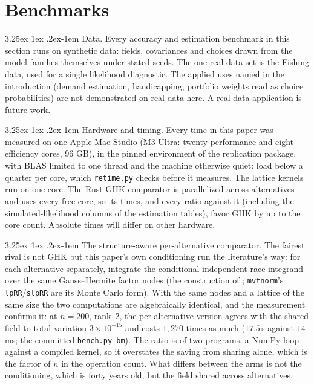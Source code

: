 \documentclass[11pt]{article}
\makeatletter
\renewcommand\paragraph{\@startsection{paragraph}{4}{\z@}%
  {3.25ex \@plus1ex \@minus.2ex}{-1em}%
  {\normalfont\normalsize\itshape}}
\makeatother
\begin{document}
\section{Benchmarks}\label{sec:num}

\paragraph{Data.} Every accuracy and estimation benchmark in this section
runs on synthetic data: fields, covariances and choices drawn from the
model families themselves under stated seeds. The one real data set is
the Fishing data, used for a single likelihood diagnostic. The applied
uses named in the introduction (demand estimation, handicapping,
portfolio weights read as choice probabilities) are not demonstrated on
real data here. A real-data application is future work.

\paragraph{Hardware and timing.} Every time in this paper was measured on
one Apple Mac Studio (M3 Ultra: twenty performance and eight efficiency
cores, 96 GB), in the pinned environment of the replication package, with
BLAS limited to one thread and the machine otherwise quiet: load below a
quarter per core, which \texttt{retime.py} checks before it measures. The
lattice kernels run on one core. The Rust GHK comparator is parallelized
across alternatives and uses every free core, so its times, and every
ratio against it (including the simulated-likelihood columns of the
estimation tables), favor GHK by up to the core count. Absolute times
will differ on other hardware.

\paragraph{The structure-aware per-alternative comparator.} The fairest
rival is not GHK but this paper's own conditioning run the literature's
way: for each alternative separately, integrate the conditional
independent-race integrand over the same Gauss--Hermite factor nodes
(the construction of \citet{butler1982}; \texttt{mvtnorm}'s
\texttt{lpRR}/\texttt{slpRR} are its Monte Carlo form). With the same
nodes and a lattice of the same size the two computations are algebraically
identical, and the measurement
confirms it: at $n=200$, rank~2, the per-alternative
version agrees with the shared field to total variation
$3\times10^{-15}$ and costs $1{,}270$ times as much ($17.5$\,s against
$14$\,ms; the committed \texttt{bench.py bm}). The ratio is of two programs, a NumPy loop against a compiled kernel, so it
overstates the saving from sharing alone, which is the factor of $n$ in
the operation count. What differs between the arms is not the
conditioning, which is forty years old, but the field shared across
alternatives.
\end{document}
